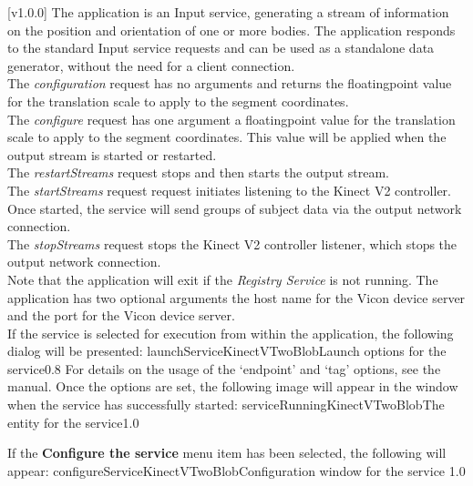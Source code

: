 [v1.0.0]
The  application is an Input service,
generating a stream of information on the position and orientation of one or more bodies.
The application responds to the standard Input service requests and can be used as a
standalone data generator, without the need for a client connection.\\

The \emph{configuration} request has no arguments and returns the floating\longDash{}point
value for the translation scale to apply to the segment coordinates.\\

The \emph{configure} request has one argument \longDash{} a floating\longDash{}point
value for the translation scale to apply to the segment coordinates.
This value will be applied when the output stream is started or restarted.\\ 

The \emph{restartStreams} request stops and then starts the output stream.\\

The \emph{startStreams} request request initiates listening to the Kinect V2 controller.
Once started, the service will send groups of subject data via the output \yarp{} network
connection.\\

The \emph{stopStreams} request stops the Kinect V2 controller listener, which stops the
output \yarp{} network connection.\\ 

Note that the application will exit if the \emph{Registry Service} is not running.
The application has two optional arguments \longDash{} the host name for the Vicon device
server and the port for the Vicon device server.
\insertAppParameters
\condPage
\insertTagDescription{\KVtwoBI}
\insertInputServiceComment\\

\insertStandardServiceCommands
\secondaryEnd
{}
If the service is selected for execution from within the \emph{\MMMU} application, the
following dialog will be presented:
%
{launchServiceKinectVTwoBlob}{Launch options for the \KVtwoBI{} service}{0.8}
\condPage{}
For details on the usage of the `endpoint' and `tag' options, see the \emph{\MMMU} manual.
Once the options are set, the following image will appear in the \emph{\MMMU} window when
the service has successfully started:
%
{serviceRunningKinectVTwoBlob}{The \emph{\MMMU} entity for the \KVtwoBI{} service}{1.0}

If the \textbf{Configure the service} menu item has been selected, the following will
appear:
%
{configureServiceKinectVTwoBlob}{Configuration window for the \emph{\KVtwoBI} service}%
{1.0}
\secondaryEnd
\primaryEnd{}
